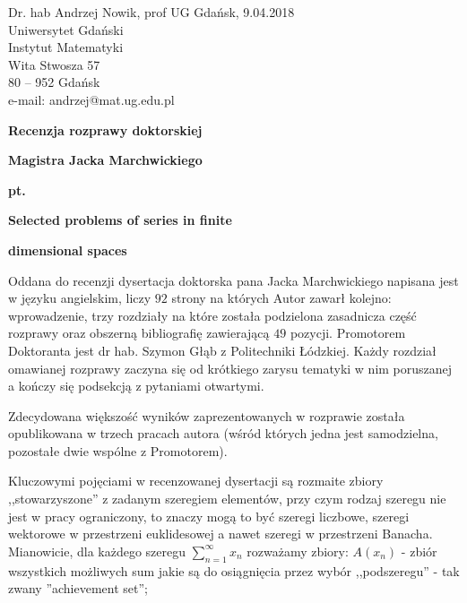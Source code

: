 \documentclass[12pt]{article}
\begin{document}
\large

\begin{flushleft}
Dr. hab Andrzej Nowik, prof UG \hfill Gdańsk, 9.04.2018 \\
Uniwersytet Gdański \\
Instytut Matematyki \\
Wita Stwosza 57 \\
80 -- 952 Gdańsk \\
e-mail: andrzej@mat.ug.edu.pl\\
\end{flushleft}
\vspace{3mm}
\begin{center}{\bf \LARGE
Recenzja rozprawy doktorskiej }
\end{center}
\begin{center}
{\LARGE \bf
Magistra Jacka Marchwickiego
}
\end{center}
\begin{center}
\bf \Large pt.
\end{center}
\begin{center} \LARGE
\bf Selected problems of series in finite
\end{center}

\begin{center} \LARGE
\bf dimensional spaces
\end{center}


  Oddana do recenzji dysertacja doktorska pana Jacka Marchwickiego 
napisana jest w języku angielskim, liczy $92$
strony na których Autor zawarł kolejno: wprowadzenie, trzy
rozdzia\-ły na które została podzielona zasadnicza część rozprawy 
oraz obszerną biblio\-grafię zawie\-ra\-ją\-cą
$49$ pozycji. Promotorem Doktoranta jest dr hab. Szymon Głąb
z Politechniki Łódzkiej. Każdy rozdział omawianej rozprawy 
zaczyna się od krótkiego zarysu tematyki w nim poruszanej
a kończy się podsekcją z pytaniami otwartymi.

  Zdecydowana większość wyników zaprezentowanych w rozprawie
została opublikowana w trzech pracach autora (wśród których
jedna jest samodzielna, pozostałe dwie wspólne z Promotorem).

  Kluczowymi pojęciami w recenzowanej dysertacji są
rozmaite zbiory ,,stowarzyszone'' z zadanym szeregiem
elementów, przy czym rodzaj szeregu nie jest w pracy ograniczony,
to znaczy mogą to być szeregi liczbowe, szeregi wektorowe w 
przestrzeni euklidesowej a nawet szeregi w przestrzeni Banacha.
  Mianowicie, dla każdego szeregu $\sum_{n=1}^\infty x_n$
rozważamy zbiory:
$A(x_n)$ - zbiór wszystkich możliwych sum jakie są
do osiągnięcia przez wybór ,,podszeregu'' - tak zwany
''achievement set'';
\end{document}
